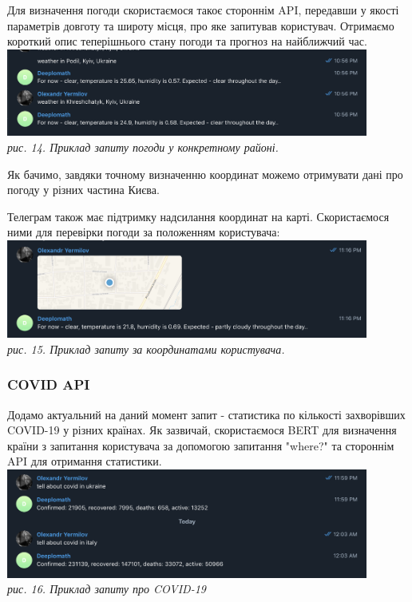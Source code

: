 Для визначення погоди скористаємося такоє стороннім API, передавши у якості параметрів довготу та широту місця, про яке запитував користувач. Отримаємо короткий опис теперішнього стану погоди та прогноз на найближчий час. \\
\includegraphics[width = 450]{Dissertation/weather2.png}\\
\textit{рис. 14. Приклад запиту погоди у конкретному районі.}

Як бачимо, завдяки точному визначенню координат можемо отримувати дані про погоду у різних частина Києва.

Телеграм також має підтримку надсилання координат на карті. Скористаємося ними для перевірки погоди за положенням користувача:\\
\includegraphics[width = 450]{Dissertation/weather3.png}\\
\textit{рис. 15. Приклад запиту за координатами користувача.}

\subsubsection{COVID API}
Додамо актуальний на даний момент запит - статистика по кількості захворівших COVID-19 у різних країнах. Як зазвичай, скористаємося BERT для визначення країни з запитання користувача за допомогою запитання "where?" та стороннім API для отримання статистики.\\
\includegraphics[width = 450]{Dissertation/covid.png}\\
\textit{рис. 16. Приклад запиту про COVID-19}
 

